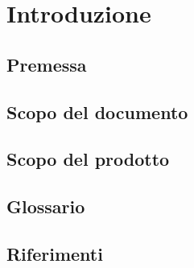 \section{Introduzione}
\subsection{Premessa}
\subsection{Scopo del documento}
\subsection{Scopo del prodotto}
\subsection{Glossario}
\subsection{Riferimenti}